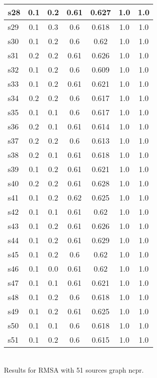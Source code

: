 \documentclass{article}
\begin{document}
\begin{tabular}{|l|c|c|c|c|c|c|}
\hline
s28 &0.1 & 0.2 & 0.61 & 0.627 & 1.0 & 1.0\\
\hline
s29 &0.1 & 0.3 & 0.6 & 0.618 & 1.0 & 1.0\\
\hline
s30 &0.1 & 0.2 & 0.6 & 0.62 & 1.0 & 1.0\\
\hline
s31 &0.2 & 0.2 & 0.61 & 0.626 & 1.0 & 1.0\\
\hline
s32 &0.1 & 0.2 & 0.6 & 0.609 & 1.0 & 1.0\\
\hline
s33 &0.1 & 0.2 & 0.61 & 0.621 & 1.0 & 1.0\\
\hline
s34 &0.2 & 0.2 & 0.6 & 0.617 & 1.0 & 1.0\\
\hline
s35 &0.1 & 0.1 & 0.6 & 0.617 & 1.0 & 1.0\\
\hline
s36 &0.2 & 0.1 & 0.61 & 0.614 & 1.0 & 1.0\\
\hline
s37 &0.2 & 0.2 & 0.6 & 0.613 & 1.0 & 1.0\\
\hline
s38 &0.2 & 0.1 & 0.61 & 0.618 & 1.0 & 1.0\\
\hline
s39 &0.1 & 0.2 & 0.61 & 0.621 & 1.0 & 1.0\\
\hline
s40 &0.2 & 0.2 & 0.61 & 0.628 & 1.0 & 1.0\\
\hline
s41 &0.1 & 0.2 & 0.62 & 0.625 & 1.0 & 1.0\\
\hline
s42 &0.1 & 0.1 & 0.61 & 0.62 & 1.0 & 1.0\\
\hline
s43 &0.1 & 0.2 & 0.61 & 0.626 & 1.0 & 1.0\\
\hline
s44 &0.1 & 0.2 & 0.61 & 0.629 & 1.0 & 1.0\\
\hline
s45 &0.1 & 0.2 & 0.6 & 0.62 & 1.0 & 1.0\\
\hline
s46 &0.1 & 0.0 & 0.61 & 0.62 & 1.0 & 1.0\\
\hline
s47 &0.1 & 0.1 & 0.61 & 0.621 & 1.0 & 1.0\\
\hline
s48 &0.1 & 0.2 & 0.6 & 0.618 & 1.0 & 1.0\\
\hline
s49 &0.1 & 0.2 & 0.61 & 0.625 & 1.0 & 1.0\\
\hline
s50 &0.1 & 0.1 & 0.6 & 0.618 & 1.0 & 1.0\\
\hline
s51 &0.1 & 0.2 & 0.6 & 0.615 & 1.0 & 1.0\\
\hline
\end{tabular}\\

\noindent Results for RMSA with 51 sources graph ncpr.
\end{document}
